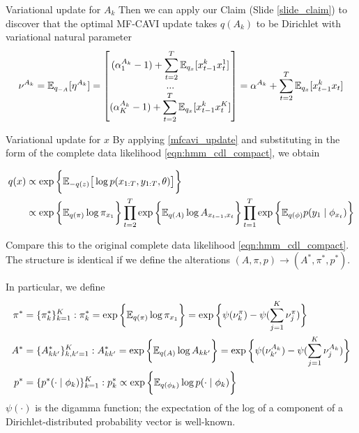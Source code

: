 \documentclass[10pt]{beamer}
\begin{document}
{\begin{frame}{Variational update for $A_k$}
Then we can apply our Claim (Slide \ref{slide_claim}) to discover that the optimal MF-CAVI update takes $q(A_k)$ to be Dirichlet with variational natural parameter 
\small 
\[  \nu^{A_k} = \mathbb{E}_{q_{-A}} [\eta^{A_k}]=
 \begin{bmatrix} 
(\alpha_1^{A_k}  -1) + \displaystyle\sum_{t=2}^T \mathbb{E}_{q_x} [ x_{t-1}^k x_t^{1} ] \\
... \\
(\alpha_K^{A_k}  -1) + \displaystyle\sum_{t=2}^T  \mathbb{E}_{q_x} [ x_{t-1}^k x_t^{K}] \\
 \end{bmatrix}  
 =  \alpha^{A_k}  + \displaystyle\sum_{t=2}^T \mathbb{E}_{q_x} [x_{t-1}^k x_t] 
  \]

\end{frame}

\begin{frame}{Variational update for $x$}
By applying \eqref{mfcavi_update} and substituting in the form of the complete data likelihood \eqref{eqn:hmm_cdl_compact}, we obtain 

\small
\begin{align*}
q(x) & \propto \exp \bigg\{ \mathbb{E}_{-q(z)} \big[ \log p(x_{1:T}, y_{1:T}, \theta) \big] \bigg\} \\
 &\propto \exp \bigg\{ \mathbb{E}_{q(\pi)} \log \pi_{x_1} \bigg\} \displaystyle\prod_{t=2}^T \exp \bigg\{  \mathbb{E}_{q(A)}   \log A_{x_{t-1}, x_t} \bigg\} \displaystyle\prod_{t=1}^T \exp \bigg\{  \mathbb{E}_{q(\phi)} p(y_1 \; | \; \phi_{x_t})  \bigg\}
\end{align*}
\normalsize 

Compare this to the original complete data likelihood \eqref{eqn:hmm_cdl_compact}. The structure is identical if we define the alterations  $(A, \pi, p) \to (A^*, \pi^*, p^*)$.

\end{frame}

\begin{frame}
In particular, we define 
\begin{align*}
\pi^* &= \{ \pi^*_k \}_{k=1}^K : \pi^*_k =\exp \bigg\{ \mathbb{E}_{q(\pi)} \log \pi_{x_1} \bigg\} = \exp \bigg\{  \psi(\nu_k^\pi) - \psi(\displaystyle\sum_{j=1}^K \nu_j^\pi) \bigg\} \\
A^* &= \{A_{kk'}^* \}_{k,k'=1}^K : A_{kk'}^*  = \exp \bigg\{  \mathbb{E}_{q(A)}   \log A_{kk'} \bigg\} = \exp \bigg\{   \psi(\nu_{k'}^{A_k}) - \psi(\displaystyle\sum_{j=1}^K \nu_j^{A_k}) \bigg\} \\
p^* &= \{ p^*( \cdot \; | \; \phi_k) \}_{k=1}^K : p^*_k \propto \exp \bigg\{ \mathbb{E}_{q(\phi_k)} \log p( \cdot \; | \; \phi_k)\bigg\}
\end{align*}
\tiny $\psi(\cdot)$ is the digamma function; the expectation of the log of a component of a Dirichlet-distributed probability vector is well-known. \normalsize 


\end{frame}}
\end{document}
